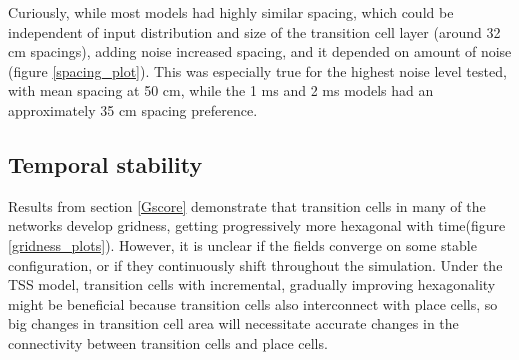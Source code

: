 \documentclass{article}
\begin{document}
    Curiously, while most models had highly similar spacing, which could be independent of input distribution and size of the transition cell layer (around 32 cm spacings), adding noise increased spacing, and it depended on amount of noise (figure \ref{spacing_plot}). This was especially true for the highest noise level tested, with mean spacing at 50 cm, while the 1 ms and 2 ms models had an approximately 35 cm spacing preference.

    \subsection{Temporal stability} \label{TempStab}

    Results from section \ref{Gscore} demonstrate that transition cells in many of the networks develop gridness, getting progressively more hexagonal with time(figure \ref{gridness_plots}). However, it is unclear if the fields converge on some stable configuration, or if they continuously shift throughout the simulation. Under the TSS model, transition cells with incremental, gradually improving hexagonality might be beneficial because transition cells also interconnect with place cells, so big changes in transition cell area will necessitate accurate changes in the connectivity between transition cells and place cells.
\end{document}
